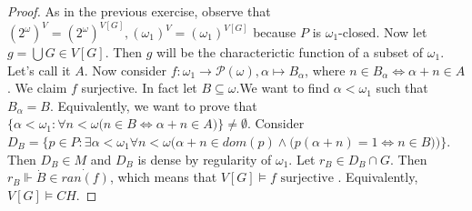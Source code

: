 \documentclass[a4paper,12pt]{article}
\theoremstyle{plain}
\theoremstyle{definition}
\theoremstyle{remark}
\begin{document}
\begin{proof}
	
	As in the previous exercise, observe that $(2^{\omega})^V = (2^{\omega})^{V[G]}, (\omega_1)^V = (\omega_1)^{V[G]}$ because $P$ is $\omega_1$-closed.
	Now let $g = \bigcup G \in V[G]$. Then $g$ will be the characterictic function of a subset of $\omega_1$. Let's call it $A$.
	Now consider $f: \omega_1 \to \mathcal{P}(\omega), \alpha \mapsto B_{\alpha}$, where $n \in B_{\alpha} \iff \alpha + n \in A$.
	We claim $f$ surjective. In fact let $B \subseteq \omega$.We want to find $\alpha < \omega_1$ such that $B_{\alpha} = B$.
	Equivalently, we want to prove that $\{\alpha < \omega_1 : \forall n< \omega \big( n \in B \iff \alpha + n \in A \big) \} \not = \emptyset$.
	Consider $D_B = \{p \in P : \exists \alpha< \omega_1 \forall n<\omega 
	\bigg( \alpha + n \in dom(p) \land \big( p(\alpha + n) = 1 \iff n \in B \big) \bigg) \}$.
	Then $D_{B} \in M$ and $D_B$ is dense by regularity of $\omega_1$.
	Let $r_B \in D_B \cap G$. Then $r_B \Vdash \dot{B} \in \dot{ran(f)}$, which means that $V[G] \models f \text{ surjective }$.
	Equivalently, $V[G] \models CH$.

\end{proof}
\end{document}
